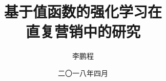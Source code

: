 \documentclass[master]{ustcthesis}
\title{基于值函数的强化学习在\\直复营销中的研究}
\author{李鹏程}
\date{二〇一八年四月}    %
\begin{document}
\maketitle


\frontmatter

\tableofcontents
\listoftables
\listofalgorithms
\listoffigures


\mainmatter







\appendix


\backmatter


\end{document}
